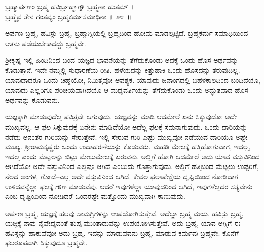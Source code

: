 \begin{shloka}
ಬ್ರಹ್ಮಾರ್ಪಣಂ ಬ್ರಹ್ಮ ಹವಿರ್ಬ್ರಹ್ಮಾಗ್ನೌ ಬ್ರಹ್ಮಣಾ ಹುತಮ್~।\\ಬ್ರಹ್ಮೈವ ತೇನ ಗಂತವ್ಯಂ ಬ್ರಹ್ಮಕರ್ಮಸಮಾಧಿನಾ \hfill॥ ೨೪~॥
\end{shloka}

\begin{artha}
ಅರ್ಪಣ ಬ್ರಹ್ಮ, ಹವಿಸ್ಸು ಬ್ರಹ್ಮ, ಬ್ರಹ್ಮಾಗ್ನಿಯಲ್ಲಿ ಬ್ರಹ್ಮದಿಂದ ಹೋಮ ಮಾಡಲ್ಪಟ್ಟಿದೆ. ಬ್ರಹ್ಮಕರ್ಮ ಸಮಾಧಿಯಿಂದ ಆತನು ಪಡೆಯಬೇಕಾದದ್ದು ಬ್ರಹ್ಮವೇ.
\end{artha}

ಶ‍್ರೀಕೃಷ್ಣ ಇಲ್ಲಿ ಹಿಂದಿನಿಂದ ಬಂದ ಯಜ್ಞದ ಭಾವನೆಯನ್ನು ತೆಗೆದುಕೊಂಡು ಅದಕ್ಕೆ ಒಂದು ಹೊಸ ಅರ್ಥವನ್ನು ಕೊಡುತ್ತಾನೆ. ಇದೇ ನಮ್ಮಲ್ಲಿ ಸುಧಾರಣೆಯ ರೀತಿ. ಹಳೆಯದನ್ನು ಕಿತ್ತುಹಾಕಿ ಒಂದು ಹೊಸದನ್ನು ತರುವುದಿಲ್ಲ. ಯಾವುದಾದರೂ ಒಂದು ಚಿಹ್ನೆಯೋ, ನಿಮಿತ್ತವೋ ಆವಶ್ಯಕ. ಯಾವುದು ಜನಾಂಗದಲ್ಲಿ ಬಹಳಕಾಲದಿಂದ ಬಂದಿದೆಯೊ, ಯಾವುದು ಎಲ್ಲರಿಗೂ ಪರಿಚಯವಾಗಿದೆಯೊ ಆ ಮಧ್ಯವರ್ತಿಯನ್ನು ತೆಗೆದುಕೊಂಡು ಒಂದು ಅದ್ಭುತವಾದ ಹೊಸ ಅರ್ಥವನ್ನು ಕೊಡುವನು.

ಯಜ್ಞಕ್ಕಾಗಿ ಮಾಡುವುದೆಲ್ಲ ಪವಿತ್ರವೇ ಆಗುವುದು. ಯಜ್ಞವನ್ನು ಮಾಡಿ ಆದಮೇಲೆ ಏನು ಸಿಕ್ಕುವುದೋ ಅದೇ ಮುಖ್ಯವಲ್ಲ. ಆ ಫಲ ಸಿಕ್ಕುವುದಕ್ಕೆ ಏನೇನು ಮಾಡಿದೆಯೋ ಅದೆಲ್ಲ ಫಲಕ್ಕೆ ಸಮನಾಗುವುದು. ಒಂದು ದಾರಿಯನ್ನು ನಡೆದು ಅನಂತರ ಗುರಿಯನ್ನು ಸೇರುತ್ತೇವೆ. ಇಲ್ಲಿ ಸೇರುವ ಗುರಿ ಎಷ್ಟು ಮುಖ್ಯವೋ ನಡೆಯುವ ದಾರಿಯೂ ಅಷ್ಟೇ ಮುಖ್ಯ. ಶ‍್ರೀರಾಮಕೃಷ್ಣರು ಒಂದು ಉದಾಹರಣೆಯನ್ನು ಕೊಡುವರು. ಮಹಡಿ ಮೇಲಕ್ಕೆ ಹತ್ತಿಹೋಗುವಾಗ, ಇದಲ್ಲ, ಇದಲ್ಲ ಎಂದು ಮೆಟ್ಟಲನ್ನು ಬಿಟ್ಟು ಮೇಲುಮೇಲಕ್ಕೆ ಏರುವನು. ಅಲ್ಲಿಗೆ ಹೋಗಿ ಆದಮೇಲೆ ಅದು ಯಾವ ವಸ್ತುವಿನಿಂದ ಆಗಿದೆಯೋ ಅದೇ ವಸ್ತುವಿನಿಂದ ಎಲ್ಲವೂ ಆಗಿದೆ ಎಂಬುದು ಗೊತ್ತಾಗುವುದು. ಅಲ್ಲಿಗೆ ಹತ್ತಿಬಂದ ಮೆಟ್ಟಲು ಉಪ್ಪರಿಗೆ, ನೆಲದ ಅಂಗಳ, ಗೋಡೆ–ಎಲ್ಲ ಅದೇ ವಸ್ತುವಿನಿಂದ ಆಗಿದೆ. ಕೇವಲ ಫಲಾಪೇಕ್ಷೆಯ ದೃಷ್ಟಿಯಿಂದ ನೋಡಿದಾಗ ಉಳಿದವನ್ನೆಲ್ಲಾ ಫಲಕ್ಕೆ ಗೌಣ ಮಾಡುವೆವು. ಆದರೆ ಇವುಗಳೆಲ್ಲಾ ಯಾವುದರಿಂದ ಆಗಿದೆ, ಇವುಗಳೆಲ್ಲದರ ಸತ್ಯವೇನು ಎಂಬ ದೃಷ್ಟಿಯಿಂದ ನೋಡಿದರೆ ಒಂದರಷ್ಟೇ ಮತ್ತೊಂದು ಮುಖ್ಯವಾಗಿ ಕಾಣುವುದು.

ಅರ್ಪಣ ಬ್ರಹ್ಮ, ಯಜ್ಞಕ್ಕೆ ಹಲವು ಸಾಮಗ್ರಿಗಳನ್ನು ಉಪಯೋಗಿಸುತ್ತೇವೆ. ಅದೆಲ್ಲಾ ಬ್ರಹ್ಮ ಮಯ. ಹವಿಸ್ಸು ಬ್ರಹ್ಮ, ಯಜ್ಞಕ್ಕೆ ನಾವು ನೈವೇದ್ಯದಂತೆ ತುಪ್ಪ ಮುಂತಾದುವನ್ನು ಉಪಯೋಗಿಸುತ್ತೇವೆ. ಅದು ಬ್ರಹ್ಮ. ಯಾವ ಅಗ್ನಿಗೆ ಈ ಹವಿಸ್ಸನ್ನು ಹಾಕುವೆವೋ ಅದು ಬ್ರಹ್ಮ. ಇದನ್ನು ಮಾಡುವವನು ಬ್ರಹ್ಮ. ಮಾಡುವ ಕರ್ಮವು ಬ್ರಹ್ಮವೇ. ಕೊನೆಗೆ ಫಲರೂಪವಾಗಿ ಸಿಕ್ಕುವುದೂ ಬ್ರಹ್ಮವೇ.

